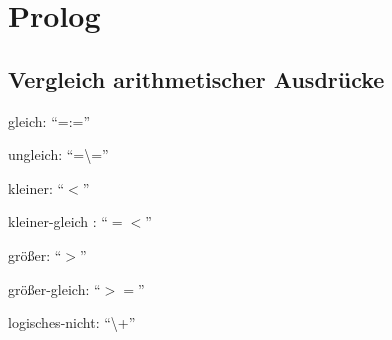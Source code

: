 \chapter{Prolog}
\section{Vergleich arithmetischer Ausdrücke}
\begin{compactitem}
	\item gleich: \enquote{=:=}
	\item ungleich: \enquote{=\textbackslash =}
	\item kleiner: \enquote{$<$}
	\item kleiner-gleich : \enquote{$=<$}
	\item größer: \enquote{$>$}
	\item größer-gleich: \enquote{$>=$}
	\item logisches-nicht: \enquote{\textbackslash +}
\end{compactitem}

